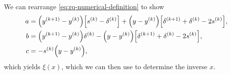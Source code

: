 We can rearrange \cref{eq:rq-numerical-definition} to show
\begin{align}
	a &=  \mathopen{}\left(y^{(k + 1)} - y^{(k)}\right)\mathclose{} \mathopen{}\left[s^{(k)} - \delta^{(k)}\right]\mathclose{} + \mathopen{}\left( y - y^{(k)} \right)\mathclose{} \mathopen{}\left[\delta^{(k + 1)} + \delta^{(k)} - 2 s^{(k)}\right]\mathclose{},\\
	b &= \mathopen{}\left(y^{(k + 1)} - y^{(k)}\right)\mathclose{} \delta^{(k)} -  \mathopen{}\left( y - y^{(k)} \right)\mathclose{} \mathopen{}\left[\delta^{(k + 1)} + \delta^{(k)} - 2 s^{(k)}\right]\mathclose{},\\
	c &= - s^{(k)} \mathopen{}\left( y - y^{(k)} \right)\mathclose{},
\end{align}
which yields $ \xi(x) $, which we can then use to determine the inverse $ x $.
